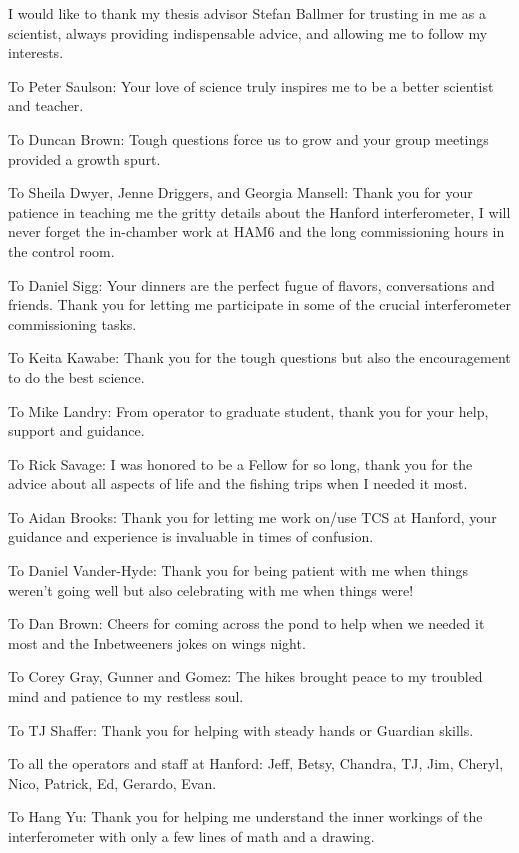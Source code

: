 	I would like to thank my thesis advisor Stefan Ballmer for trusting in me as a scientist, always providing indispensable advice, and allowing me to follow my interests.
	
	To Peter Saulson: Your love of science truly inspires me to be a better scientist and teacher.
	
	To Duncan Brown:  Tough questions force us to grow and your group meetings provided a growth spurt.
	
	To Sheila Dwyer, Jenne Driggers, and Georgia Mansell: Thank you for your patience in teaching me the gritty details about the Hanford interferometer, I will never forget the in-chamber work at HAM6 and the long commissioning hours in the control room.
	
	To Daniel Sigg: Your dinners are the perfect fugue of flavors, conversations and friends. Thank you for letting me participate in some of the crucial interferometer commissioning tasks.
	
	To Keita Kawabe: Thank you for the tough questions but also the encouragement to do the best science.
	
	To Mike Landry: From operator to graduate student, thank you for your help, support and guidance.
	
	To Rick Savage: I was honored to be a Fellow for so long, thank you for the advice about all aspects of life and the fishing trips when I needed it most.
	
	To Aidan Brooks: Thank you for letting me work on/use TCS at Hanford, your guidance and experience is invaluable in times of confusion.
	
	To Daniel Vander-Hyde: Thank you for being patient with me when things weren't going well but also celebrating with me when things were!
	
	To Dan Brown: Cheers for coming across the pond to help when we needed it most and the Inbetweeners jokes on wings night.
	
	To Corey Gray, Gunner and Gomez: The hikes brought peace to my troubled mind and patience to my restless soul.
	
	To TJ Shaffer: Thank you for helping with steady hands or Guardian skills.
	
	To all the operators and staff at Hanford: Jeff, Betsy, Chandra, TJ, Jim, Cheryl, Nico, Patrick, Ed, Gerardo, Evan.
	
	To Hang Yu: Thank you for helping me understand the inner workings of the interferometer with only a few lines of math and a drawing.
	
